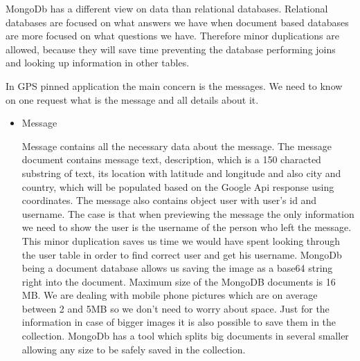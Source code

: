 \documentclass[thesis=M,english]{FITthesis}[2012/10/20]
\begin{document}
MongoDb has a different view on data than relational databases. Relational databases are focused on what answers we have when document based databases are more focused on what questions we have. Therefore minor duplications are allowed, because they will save time preventing the database performing joins and looking up information in other tables.

In GPS pinned application the main concern is the messages. We need to know on one request what is the message and all details about it. 
\begin{itemize}
\item Message

Message contains all the necessary data about the message. The message document contains message text, description, which is a 150 characted substring of text, its location with latitude and longitude and also city and country, which will be populated based on the Google Api response using coordinates. The message also contains object user with user's id and username. The case is that when previewing the message the only information we need to show the user is the username of the person who left the message. This minor duplication saves us time we would have spent looking through the user table in order to find correct user and get his username. MongoDb being a document database allows us saving the image as a base64 string right into the document. Maximum size of the MongoDB documents is 16 MB. We are dealing with mobile phone pictures which are on average between 2 and 5MB so we don't need to worry about space. %
Just for the information in case of bigger images it is also possible to save them in the collection. MongoDb has a tool which splits big documents in several smaller allowing any size to be safely saved in the collection. 


\end{itemize}
\end{document}
